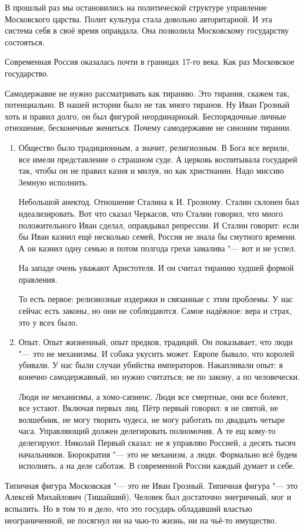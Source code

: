 В прошлый раз мы остановились на политической структуре управление Московского царства. Полит культура стала довольно авторитарной. И эта система себя в своё время оправдала. Она позволила Московскому государству состояться.

Современная Россия оказалась почти в границах 17-го века. Как раз Московское государство.

Самодержавие не нужно рассматривать как тиранию. Это тирания, скажем так, потенциально. В нашей истории было не так много тиранов. Ну Иван Грозный хоть и правил долго, он был фигурой неординарноый. Беспорядочные личные отношение, бесконечные жениться.
Почему самодержавие не синоним тирании. 
\begin{enumerate}
\item Общество было традиционным, а значит, религиозным. В Бога все верили, все имели представление о страшном суде. А церковь воспитывала государей так, чтобы он не правил казня и милуя, но как христианин. Надо миссию Земную исполнить.

Небольшой анектод. Отношение Сталина к И. Грозному. Сталин склонен был идеализировать. Вот что сказал Черкасов, что Сталин говорил, что много положительного Иван сделал, оправдывал репрессии. И Сталин говорит: если бы Иван казнил ещё несколько семей, Россия не знала бы смутного времени. А он казнил одну семью и потом полгода грехи замалива "--- вот и не успел.

На западе очень уважают Аристотеля. И он считал тиранию худшей формой правления.

То есть первое: релизиозные издержки и связанные с этим проблемы. У нас сейчас есть законы, но они не соблюдаются. Самое надёжное: вера и страх, это у всех было.
\item Опыт. Опыт жизненный, опыт предков, традиций. Он показывает, что люди "--- это не механизмы. И собака укусить может. Европе бывало, что королей убивали. У нас были случаи убийства императоров. Накапливали опыт: я конечно самодержавный, но нужно считаться; не по закону, а по человечески.

Люди не механизмы, а хомо-сапиенс. Люди все смертные, они все болеют, все устают. Включая первых лиц. Пётр первый говорил: я не святой, не волшебник, не могу творить чудеса, не могу работать по двадцать четыре часа. Управляющий должен делегировать полномочия. А те ещ кому-то делегируют. Николай Первый сказал: не я управляю Россией, а десять тысяч начальников. Бюрократия "--- это не механизм, а люди. Формально всё будем исполнять, а на деле саботаж. В современной России каждый думает и себе.
\end{enumerate}
Типичная фигура Московская "--- это не Иван Грозный. Типичная фигура "--- это Алексей Михайлович (Тишайший). Человек был достаточно энегричный, мог и вспылить. Но в том то и дело, что это государь обладавший властью неограниченной, не посягнул ни на чью-то жизнь, ни на чьё-то имущество.

